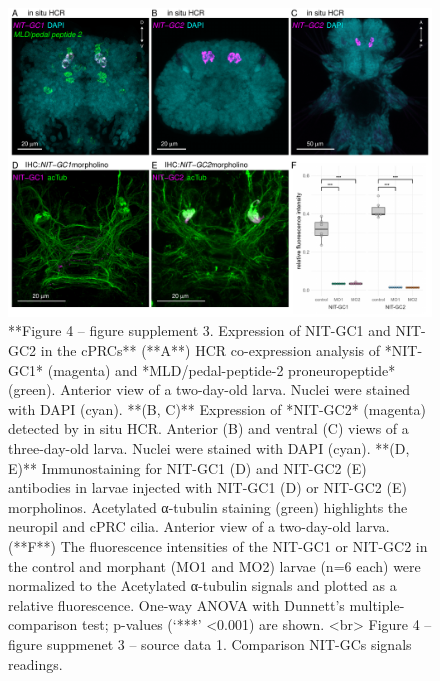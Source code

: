 \documentclass[
  10pt,
  onecolumn]{article}
\begin{document}
\begin{figure}
\includegraphics[width=33.33in]{figures/Fig4_sup3} \caption{**Figure 4 -- figure supplement 3. Expression of NIT-GC1 and NIT-GC2 in the cPRCs** (**A**) HCR co-expression analysis of *NIT-GC1* (magenta) and *MLD/pedal-peptide-2 proneuropeptide* (green). Anterior view of a two-day-old larva. Nuclei were stained with DAPI (cyan). **(B, C)** Expression of *NIT-GC2* (magenta) detected by in situ HCR. Anterior (B) and ventral (C) views of a three-day-old larva. Nuclei were stained with DAPI (cyan). **(D, E)** Immunostaining for NIT-GC1 (D) and NIT-GC2 (E) antibodies in larvae injected with NIT-GC1 (D) or NIT-GC2 (E) morpholinos. Acetylated α-tubulin staining (green) highlights the neuropil and cPRC cilia. Anterior view of a two-day-old larva. (**F**) The fluorescence intensities of the NIT-GC1 or NIT-GC2 in the control and morphant (MO1 and MO2) larvae (n=6 each) were normalized to the Acetylated α-tubulin signals and plotted as a relative fluorescence. One-way ANOVA with Dunnett’s multiple-comparison test; p-values (‘***’ <0.001) are shown. <br> Figure 4 -- figure suppmenet 3 -- source data 1. Comparison NIT-GCs signals readings.}\label{fig:unnamed-chunk-18}
\end{figure}
\end{document}
